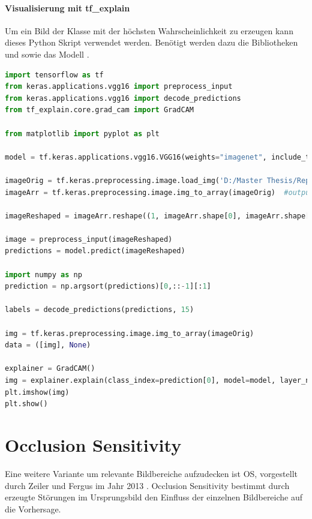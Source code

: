 \documentclass[
  12pt, %
  a4paper, %
  oneside, %
  openany, 
  numbers=noenddot, %
  BCOR=5mm, %
  parskip=half*, %
  thesis, %
]{bfhbook}
\begin{document}
\paragraph*{Visualisierung mit tf\_explain}
\break
Um ein Bild der Klasse mit der höchsten Wahrscheinlichkeit zu erzeugen kann dieses Python Skript verwendet werden. Benötigt werden dazu die Bibliotheken \parencite{TensorFlow} und  \parencite{tfExplain} sowie das Modell \parencite{vgg16}.
\begin{lstlisting}[language=Python, caption=Grad CAM Visualisierung für die wahrscheinlichste Klasse]
import tensorflow as tf
from keras.applications.vgg16 import preprocess_input
from keras.applications.vgg16 import decode_predictions
from tf_explain.core.grad_cam import GradCAM

from matplotlib import pyplot as plt

model = tf.keras.applications.vgg16.VGG16(weights="imagenet", include_top=True)

imageOrig = tf.keras.preprocessing.image.load_img('D:/Master Thesis/Repo/Test Images/tabby.2.JPG', target_size=(224, 224))
imageArr = tf.keras.preprocessing.image.img_to_array(imageOrig)  #output Numpy-array

imageReshaped = imageArr.reshape((1, imageArr.shape[0], imageArr.shape[1], imageArr.shape[2]))

image = preprocess_input(imageReshaped)
predictions = model.predict(imageReshaped)

import numpy as np
prediction = np.argsort(predictions)[0,::-1][:1]

labels = decode_predictions(predictions, 15)

img = tf.keras.preprocessing.image.img_to_array(imageOrig)
data = ([img], None)
    
explainer = GradCAM()
img = explainer.explain(class_index=prediction[0], model=model, layer_name='block5_conv3', validation_data=data)
plt.imshow(img)
plt.show()
\end{lstlisting}

\section{Occlusion Sensitivity}
\label{os}
Eine weitere Variante um relevante Bildbereiche aufzudecken ist \Gls{OS}, vorgestellt durch Zeiler  und Fergus im Jahr 2013 \parencite{Zeiler2013}. Occlusion Sensitivity bestimmt durch erzeugte Störungen im Ursprungsbild den Einfluss der einzelnen Bildbereiche auf die Vorhersage.
\end{document}
